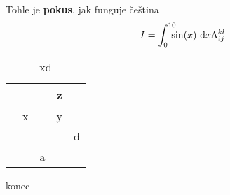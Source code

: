 \documentclass{article}
\begin{document}
    Tohle je {\bf pokus}, jak funguje čeština
    \begin{equation}
        I = \int_0^{10} \!\!\!\! \sin(x) \ {\rm d}x \Lambda_{ij}^{kl}
    \end{equation}
    

    \begin{table}[h]
        \centering
        \begin{tabular}{|l|l|l|l|l|}
        \hline
         &   &   & z &   \\ \hline
         & x &   & y &   \\ \hline
         &   &   &   & d \\ \hline
         &   & a &   &   \\ \hline
        \end{tabular}
        \caption{xd}
        \label{tab:my-table}
    \end{table}

    konec
    \tableofcontents
\end{document}
